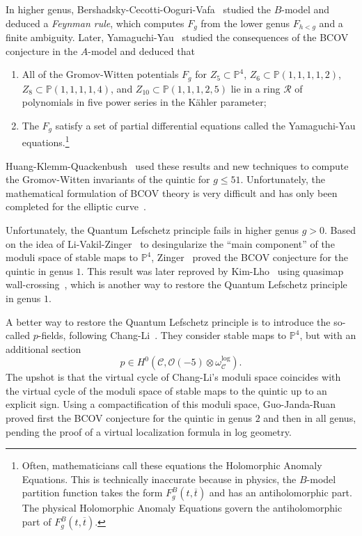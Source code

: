 \documentclass[10pt]{amsart}
\theoremstyle{definition}
\theoremstyle{remark}
\theoremstyle{plain}
\theoremstyle{definition}
\theoremstyle{remark}
\renewcommand{\P}{\mathbb{P}}
\newcommand{\msc}[1]{\mathscr{#1}}
\newcommand{\ol}[1]{\overline{#1}}
\newcommand{\1}{\mathbf{1}}
\newcommand{\2}{\mathbf{2}}
\newcommand{\3}{\mathbf{3}}
\numberwithin{equation}{section}
\begin{document}
In higher genus, Bershadsky-Cecotti-Ooguri-Vafa~\cite{bcov} studied the $B$-model and deduced a \textit{Feynman rule}, which computes $F_g$ from the lower genus $F_{h<g}$ and a finite ambiguity. Later, Yamaguchi-Yau~\cite{yy04} studied the consequences of the BCOV conjecture in the $A$-model and deduced that
\begin{enumerate}
    \item All of the Gromov-Witten potentials $F_g$ for $Z_5 \subset \P^4$, $Z_6 \subset \P(1,1,1,1,2)$, $Z_8 \subset \P(1,1,1,1,4)$, and $Z_{10} \subset \P(1,1,1,2,5)$ lie in a ring $\msc{R}$ of polynomials in five power series in the K\"ahler parameter;
    \item The $F_g$ satisfy a set of partial differential equations called the Yamaguchi-Yau equations.\footnote{Often, mathematicians call these equations the Holomorphic Anomaly Equations. This is technically inaccurate because in physics, the $B$-model partition function takes the form $F_g^B(t, \ol{t})$ and has an antiholomorphic part. The physical Holomorphic Anomaly Equations govern the antiholomorphic part of $F_g^B(t, \ol{t})$.}
\end{enumerate}
Huang-Klemm-Quackenbush~\cite{hkq} used these results and new techniques to compute the Gromov-Witten invariants of the quintic for $g \leq 51$. Unfortunately, the mathematical formulation of BCOV theory is very difficult and has only been completed for the elliptic curve~\cite{mathbcov1,mathbcov2}.

Unfortunately, the Quantum Lefschetz principle fails in higher genus $g > 0$. Based on the idea of Li-Vakil-Zinger~\cite{desingularizationgenusone,g1cilizinger} to desingularize the ``main component'' of the moduli space of stable maps to $\P^4$, Zinger~\cite{reducedgenus1} proved the BCOV conjecture for the quintic in genus $1$. This result was later reproved by Kim-Lho~\cite{kimlho} using quasimap wall-crossing~\cite{qmapwcms}, which is another way to restore the Quantum Lefschetz principle in genus $1$.

A better way to restore the Quantum Lefschetz principle is to introduce the so-called $p$-fields, following Chang-Li~\cite{pfieldschangli}. They consider stable maps to $\P^4$, but with an additional section 
\[p \in H^0(\msc{C}, \msc{O}(-5) \otimes \omega_{\msc{C}}^{\log}). \]
The upshot is that the virtual cycle of Chang-Li's moduli space coincides with the virtual cycle of the moduli space of stable maps to the quintic up to an explicit sign. Using a compactification of this moduli space, Guo-Janda-Ruan~\cite{genus2logglsm, bcovlogglsm} proved first the BCOV conjecture for the quintic in genus $2$ and then in all genus, pending the proof of a virtual localization formula in log geometry.
\end{document}
